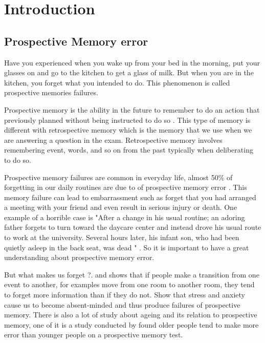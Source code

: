 
\chapter{Introduction}

\section{Prospective Memory error}


Have you experienced when you wake up from your bed in the morning, put your glasses on and
go to the kitchen to get a glass of milk. But when you are in the kitchen, you forget what
you intended to do. This phenomenon is called prospective memories failures.

Prospective memory is the ability in the future to remember to do an action that previously planned without being instructed to do so \citep{GROOT2002}. This type of memory is different with retrospective memory which is the memory that we use when we are answering a question in the exam. Retrospective memory involves remembering event, words, and so on from the past typically when deliberating to do so.

Prospective memory failures are common in everyday life, almost 50\% of forgetting in our daily routines are due to of prospective
memory error \citep{Crovitz1984}. This memory failure can lead to embarrassment such as forget that you had arranged a meeting with your friend and even result in
serious injury or death. One example of a horrible case is "After a change in his usual routine; an
adoring father forgets to turn toward the daycare center and instead drove his usual route to work
at the university. Several hours later, his infant son, who had been quietly asleep in the back seat,
was dead " \citep{Einstein2005}. So it is important to have a great understanding about prospective memory error.

But what makes us forget ?. \cite{Radvansky2006} and \cite{Radvansky2010} shows that if people make a transition from one event to another, for examples move
from one room to another room, they tend to forget more information than if they do not.
\cite{Cockburn1994} Show that stress and anxiety cause us to become absent-minded and
thus produce failures of prospective memory. There is also a lot of study about ageing and its relation to prospective memory, one of it is a study conducted by \cite{Scullin2012} found older people tend to make more error than younger people on a prospective memory test.

